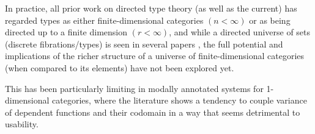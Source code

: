 \documentclass{lmcs} %
\theoremstyle{plain}\newtheorem{satz}[thm]{Satz} %
\theoremstyle{plain}
\theoremstyle{definition}
\begin{document}
In practice, all prior work on directed type theory (as well as the current) has regarded types as either finite-dimensional categories $(n < \infty)$ or as being directed up to a finite dimension $(r < \infty)$,
and while a directed universe of sets (discrete fibrations/types) is seen in several papers \cite{2dtt,riehl-shulman-dtt,weaver-licata-dua,dua-simplicial},
the full potential and implications of the richer structure of a universe of finite-dimensional categories (when compared to its elements) have not been explored yet.

This has been particularly limiting in modally annotated systems for 1-dimensional categories, where the literature shows a tendency to couple variance of dependent functions and their codomain in a way that seems detrimental to usability.   
\end{document}
